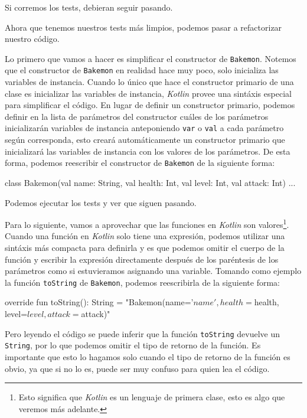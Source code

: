   Si corremos los tests, debieran seguir pasando.

  Ahora que tenemos nuestros tests más limpios, podemos pasar a refactorizar nuestro código.

  Lo primero que vamos a hacer es simplificar el constructor de \texttt{Bakemon}.
  Notemos que el constructor de \texttt{Bakemon} en realidad hace muy poco, solo inicializa las
  variables de instancia.
  Cuando lo único que hace el constructor primario de una clase es 
  inicializar las variables de instancia, \textit{Kotlin} provee una sintáxis especial para 
  simplificar el código.
  En lugar de definir un constructor primario, podemos definir en la lista de parámetros del
  constructor cuáles de los parámetros inicializarán variables de instancia anteponiendo 
  \texttt{var} o \texttt{val} a cada parámetro según corresponda, esto creará automáticamente
  un constructor primario que inicializará las variables de instancia con los valores de los
  parámetros.
  De esta forma, podemos reescribir el constructor de \texttt{Bakemon} de la siguiente forma:

  \begin{kotlin}
    class Bakemon(val name: String, val health: Int, val level: Int, val attack: Int) {...}
  \end{kotlin}

  Podemos ejecutar los tests y ver que siguen pasando.

  Para lo siguiente, vamos a aprovechar que las funciones en \textit{Kotlin} son valores\footnote{
    Esto significa que \textit{Kotlin} es un lenguaje de primera clase, esto es algo que veremos
    más adelante.
  }.
  Cuando una función en \textit{Kotlin} solo tiene una expresión, podemos utilizar una sintáxis más
  compacta para definirla y es que podemos omitir el cuerpo de la función y escribir la expresión
  directamente después de los paréntesis de los parámetros como si estuvieramos asignando una 
  variable.
  Tomando como ejemplo la función \texttt{toString} de \texttt{Bakemon}, podemos reescribirla de la
  siguiente forma:

  \begin{kotlin}
    override fun toString(): String =
      "Bakemon(name='$name', health=$health, level=$level, attack=$attack)"
  \end{kotlin}

  Pero leyendo el código se puede inferir que la función \texttt{toString} devuelve un 
  \texttt{String}, por lo que podemos omitir el tipo de retorno de la función.
  Es importante que esto lo hagamos solo cuando el tipo de retorno de la función es obvio, ya que si
  no lo es, puede ser muy confuso para quien lea el código.

